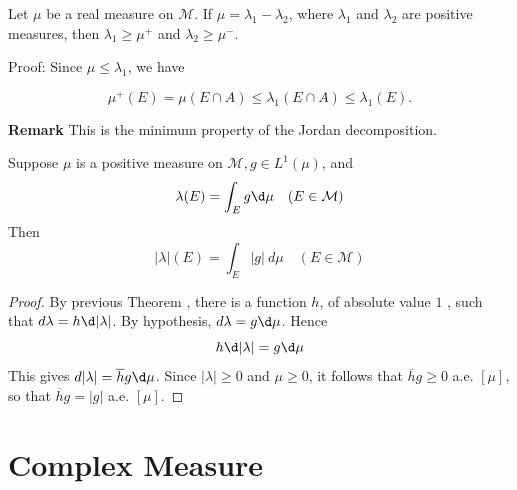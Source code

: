 \documentclass[12pt, a4paper, oneside]{book}
\begin{document}
\begin{corollary}
    Let $\mu$ be a real measure on $\mathcal{M}$. If $\mu=\lambda_1-\lambda_2$, where $\lambda_1$ and $\lambda_2$ are positive measures, then $\lambda_1 \geq \mu^{+}$ and $\lambda_2 \geq \mu^{-}$.

    Proof:
    Since $\mu \leq \lambda_1$, we have

    \begin{equation*}
        \mu^{+}(E)=\mu(E \cap A) \leq \lambda_1(E \cap A) \leq \lambda_1(E) .
    \end{equation*}


    \noindent\textbf{Remark} This is the minimum property of the Jordan decomposition.
\end{corollary}
\begin{corollary}
    Suppose $\mu$ is a positive measure on $\mathcal{M}, g \in L^1(\mu)$, and
    \begin{equation*}
        \lambda(E)=\int_{E} g \d  \mu \quad(E \in \mathcal{M})
    \end{equation*}
    Then
    \begin{equation*}
        |\lambda|(E)=\int_{E} |g| \:  d \mu \quad(E \in \mathcal{M})
    \end{equation*}
    \begin{proof}
        By previous Theorem , there is a function $h$, of absolute value $1$ , such that $d \lambda=h \d |\lambda|$. By hypothesis, $d \lambda=g \d  \mu$. Hence
        $$
            h \d |\lambda|=g \d  \mu
        $$
        This gives $d|\lambda|=\overline{h} g \d  \mu$.
        Since $|\lambda| \geq 0$ and $\mu \geq 0$, it follows that $\overline{h} g \geq 0$ a.e. $[\mu]$, so that $\overline{h} g=|g|$ a.e. $[\mu]$.
    \end{proof}
\end{corollary}










\chapter{Complex Measure}
\end{document}
